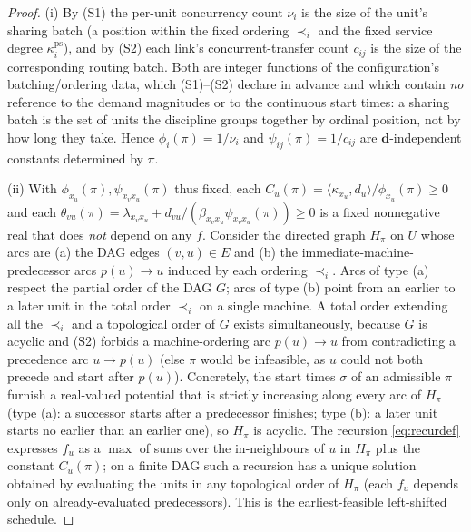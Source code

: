 \documentclass{amsart}
\theoremstyle{definition}
\begin{document}
\begin{proof}
\textup{(i)} By (S1) the per-unit concurrency count $\nu_i$ is the size of the
unit's sharing batch (a position within the fixed ordering $\prec_i$ and the
fixed service degree $\kappa^{\mathrm{ps}}_i$), and by (S2) each link's
concurrent-transfer count $c_{ij}$ is the size of the corresponding routing
batch. Both are integer functions of the configuration's batching/ordering data,
which (S1)--(S2) declare in advance and which contain \emph{no} reference to the
demand magnitudes or to the continuous start times: a sharing batch is the set of
units the discipline groups together by ordinal position, not by how long they
take. Hence $\phi_i(\pi)=1/\nu_i$ and $\psi_{ij}(\pi)=1/c_{ij}$ are
$\mathbf d$-independent constants determined by $\pi$.

\textup{(ii)} With $\phi_{x_u}(\pi),\psi_{x_vx_u}(\pi)$ thus fixed, each
$C_u(\pi)=\langle\kappa_{x_u},d_u\rangle/\phi_{x_u}(\pi)\ge0$ and each
$\theta_{vu}(\pi)=\lambda_{x_vx_u}+d_{vu}/(\beta_{x_vx_u}\psi_{x_vx_u}(\pi))\ge0$
is a fixed nonnegative real that does \emph{not} depend on any $f$. Consider the
directed graph $H_\pi$ on $U$ whose arcs are (a) the DAG edges $(v,u)\in E$ and
(b) the immediate-machine-predecessor arcs $p(u)\to u$ induced by each ordering
$\prec_i$. Arcs of type (a) respect the partial order of the DAG $G$; arcs of
type (b) point from an earlier to a later unit in the total order $\prec_i$ on a
single machine. A total order extending all the $\prec_i$ and a topological order
of $G$ exists simultaneously, because $G$ is acyclic and (S2) forbids a
machine-ordering arc $p(u)\to u$ from contradicting a precedence arc $u\to p(u)$
(else $\pi$ would be infeasible, as $u$ could not both precede and start after
$p(u)$). Concretely, the start times $\sigma$ of an admissible $\pi$ furnish a
real-valued potential that is strictly increasing along every arc of $H_\pi$
(type (a): a successor starts after a predecessor finishes; type (b): a later
unit starts no earlier than an earlier one), so $H_\pi$ is acyclic. The recursion
\eqref{eq:recurdef} expresses $f_u$ as a $\max$ of sums over the in-neighbours of
$u$ in $H_\pi$ plus the constant $C_u(\pi)$; on a finite DAG such a recursion has
a unique solution obtained by evaluating the units in any topological order of
$H_\pi$ (each $f_u$ depends only on already-evaluated predecessors). This is the
earliest-feasible left-shifted schedule.
\end{proof}
\end{document}
